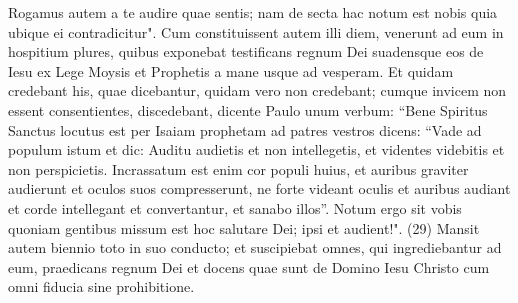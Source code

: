 \begin{biblechapter}
\verse Rogamus autem a te audire quae sentis; nam de secta hac notum est nobis quia ubique ei contradicitur". 
\verse Cum constituissent autem illi diem, venerunt ad eum in hospitium plures, quibus exponebat testificans regnum Dei suadensque eos de Iesu ex Lege Moysis et Prophetis a mane usque ad vesperam. 
\verse Et quidam credebant his, quae dicebantur, quidam vero non credebant; 
\verse cumque invicem non essent consentientes, discedebant, dicente Paulo unum verbum: “Bene Spiritus Sanctus locutus est per Isaiam prophetam ad patres vestros 
\verse dicens: “Vade ad populum istum et dic: Auditu audietis et non intellegetis, et videntes videbitis et non perspicietis. 
\verse Incrassatum est enim cor populi huius, et auribus graviter audierunt et oculos suos compresserunt, ne forte videant oculis et auribus audiant et corde intellegant et convertantur, et sanabo illos”. 
\verse Notum ergo sit vobis quoniam gentibus missum est hoc salutare Dei; ipsi et audient!". (29) 
\verse Mansit autem biennio toto in suo conducto; et suscipiebat omnes, qui ingrediebantur ad eum, 
\verse praedicans regnum Dei et docens quae sunt de Domino Iesu Christo cum omni fiducia sine prohibitione.     
\end{biblechapter}
